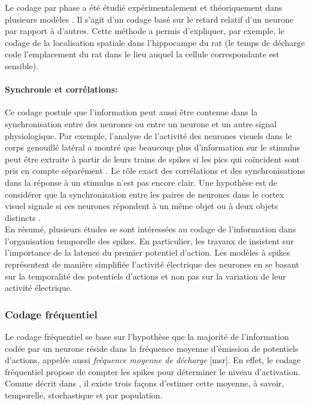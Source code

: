 Le codage par phase a été étudié expérimentalement \cite{Okeefe:1993} et théoriquement dans plusieurs modèles \cite{Hopfield:1995, Maass:1996, Jensen:1996}. Il s'agit d'un codage basé sur le retard relatif d'un neurone par rapport à d'autres. Cette méthode a permis d'expliquer, par exemple, le codage de la localisation spatiale dans l'hippocampe du rat  \cite{Okeefe:1993} (le temps de décharge code l'emplacement du rat dans le lieu auquel la cellule correspondante est sensible). 


\paragraph{Synchronie et corr\'elations:}

Ce codage postule que l'information peut aussi être contenue dans la synchronisation entre des neurones ou entre un neurone et un autre signal physiologique. Par exemple, l'analyse de l'activité des neurones visuels dans le corps genouillé latéral a montré que beaucoup plus d'information sur le stimulus peut être extraite à partir de leurs trains de spikes si les pics qui coïncident sont pris en compte séparément \cite{Alonso:1996}. Le rôle exact des corrélations et des synchronisations dans la réponse à un stimulus n'est pas encore clair. Une hypothèse est de considérer que la synchronisation entre les paires de neurones dans le cortex visuel signale si ces neurones répondent à un même objet ou à deux objets distincts \cite{VonderMalsburg:1992, Eckhorn:1988, Gray:1989}.\\

En résumé, plusieurs études se sont intéressées au codage de l'information dans l'organisation temporelle des spikes. En particulier, les travaux de \cite{Thorpe:1996} insistent sur l'importance de la latence du premier potentiel d'action. Les modèles à spikes représentent de manière simplifiée l'activité électrique des neurones en se basant sur la temporalité des potentiels d'actions et non pas sur la variation de leur activité électrique. 

\subsubsection{Codage fréquentiel}

Le codage fréquentiel se base sur l'hypothèse que la majorité de l'information codée par un neurone réside dans la fréquence moyenne d'émission de potentiels d'actions, appelée aussi \textit{fréquence moyenne de décharge} [\gls{msr}]. En effet, le codage fréquentiel propose de compter les spikes pour déterminer le niveau d'activation. Comme décrit dans \cite{Gerstner:2002}, il existe trois façons d'estimer cette moyenne, à savoir, temporelle, stochastique et par population.\\


